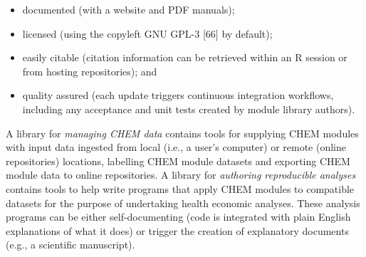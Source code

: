 \documentclass[sn-vancouver,Numbered,pdflatex]{sn-jnl}
\theoremstyle{remark}
\theoremstyle{definition}
\begin{document}
\begin{itemize}
\item
  documented (with a website and PDF manuals);
\item
  licensed (using the copyleft GNU GPL-3 {[}66{]} by default);
\item
  easily citable (citation information can be retrieved within an R session or from hosting repositories); and
\item
  quality assured (each update triggers continuous integration workflows, including any acceptance and unit tests created by module library authors).
\end{itemize}

A library for \emph{managing CHEM data} contains tools for supplying CHEM modules with input data ingested from local (i.e., a user's computer) or remote (online repositories) locations, labelling CHEM module datasets and exporting CHEM module data to online repositories. A library for \emph{authoring reproducible analyses} contains tools to help write programs that apply CHEM modules to compatible datasets for the purpose of undertaking health economic analyses. These analysis programs can be either self-documenting (code is integrated with plain English explanations of what it does) or trigger the creation of explanatory documents (e.g., a scientific manuscript).
\end{document}

